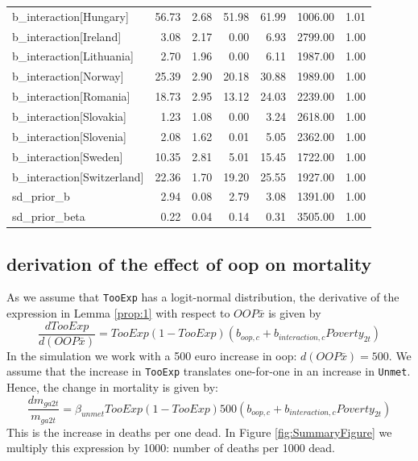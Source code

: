 \documentclass[a4paper,12pt]{article}
\begin{document}
\begin{table}[htbp]
\begin{tabular}{lrrrrrr}
b\_interaction[Hungary] & 56.73 & 2.68 & 51.98 & 61.99 & 1006.00 & 1.01\\
b\_interaction[Ireland] & 3.08 & 2.17 & 0.00 & 6.93 & 2799.00 & 1.00\\
b\_interaction[Lithuania] & 2.70 & 1.96 & 0.00 & 6.11 & 1987.00 & 1.00\\
b\_interaction[Norway] & 25.39 & 2.90 & 20.18 & 30.88 & 1989.00 & 1.00\\
b\_interaction[Romania] & 18.73 & 2.95 & 13.12 & 24.03 & 2239.00 & 1.00\\
b\_interaction[Slovakia] & 1.23 & 1.08 & 0.00 & 3.24 & 2618.00 & 1.00\\
b\_interaction[Slovenia] & 2.08 & 1.62 & 0.01 & 5.05 & 2362.00 & 1.00\\
b\_interaction[Sweden] & 10.35 & 2.81 & 5.01 & 15.45 & 1722.00 & 1.00\\
b\_interaction[Switzerland] & 22.36 & 1.70 & 19.20 & 25.55 & 1927.00 & 1.00\\
sd\_prior\_b & 2.94 & 0.08 & 2.79 & 3.08 & 1391.00 & 1.00\\
sd\_prior\_beta & 0.22 & 0.04 & 0.14 & 0.31 & 3505.00 & 1.00\\
\end{tabular}
\end{table}


\subsection{derivation of the effect of oop on mortality}
\label{sec:org9ab88f3}

As we assume that \texttt{TooExp} has a logit-normal distribution, the derivative of the expression in Lemma \ref{prop:1} with respect to \(OOP \bar{x}\) is given by
\begin{equation}
\frac{dTooExp}{d(OOP \bar{x})} = TooExp(1-TooExp) (b_{oop,c} + b_{interaction,c} Poverty_{2t})
\end{equation}
In the simulation we work with a 500 euro increase in oop: \(d(OOP \bar{x})=500\). We assume that the increase in \texttt{TooExp} translates one-for-one in an increase in \texttt{Unmet}. Hence, the change in mortality is given by:
\begin{equation}
\label{eq:effect_per_1000}
\frac{dm_{ga2t}}{m_{ga2t}} = \beta_{unmet} TooExp(1-TooExp) 500 (b_{oop,c} + b_{interaction,c} Poverty_{2t})
\end{equation}
This is the increase in deaths per one dead. In Figure \ref{fig:SummaryFigure} we multiply this expression by 1000: number of deaths per 1000 dead.
\end{document}
